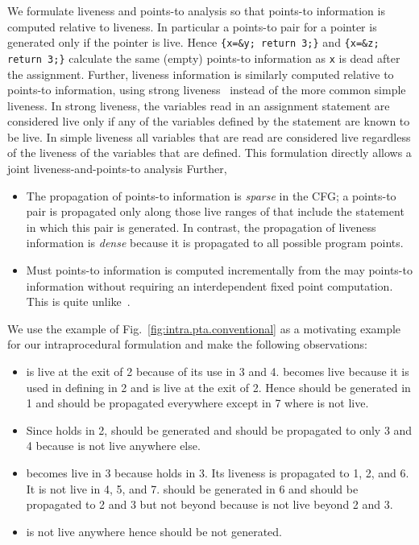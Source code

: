 \documentclass{llncs}
\newcommand{\pt}[2]{\text{}}
\begin{document}
We formulate liveness and points-to analysis so that points-to
information is computed relative to liveness. In particular a points-to
pair for a pointer is generated only if the pointer is live. Hence
{\tt \{x=\&y; return 3;\}} and {\tt \{x=\&z; return 3;\}} calculate
the same (empty) points-to information as {\tt x} is dead after the
assignment. Further, liveness information is similarly computed relative
to points-to information, using strong
liveness~\cite{Nielson.F.Nielson.HR.Hankin.C:1998:Principles-of-Program}
instead of the more common simple liveness. In strong liveness, the
variables read in an assignment statement are considered live only if
any of the variables defined by the statement are known to be live.
In simple liveness all variables that are read are considered live
regardless of the liveness of the variables that are defined. This
formulation directly allows a joint liveness-and-points-to analysis
Further,
\begin{itemize}
\item The propagation of points-to information is {\em sparse\/} in the
      CFG; a points-to pair \pt{x}{y} is propagated only along those live
      ranges of  that include the statement in which this pair is
      generated. In contrast, the propagation of liveness information
      is {\em dense\/} because it is propagated to all possible program
      points.

\item Must points-to information is computed incrementally from the may
      points-to information without requiring an interdependent fixed
      point computation. This is quite unlike~\cite{Emami.M.Ghiya.R.Hendren.LJ:1994:Context-sensitive-interprocedural-points-to,Kanade.A.Khedker.UP.Sanyal.A:2005:Heterogeneous-Fixed-Points}. 
\end{itemize}



We use the example of Fig.~\ref{fig:intra.pta.conventional} as a
motivating example for our intraprocedural formulation and make the
following observations:
\begin{itemize}
\item  is live at the exit of 2 because of its use in 3 and 4. 
      becomes live because it is used in defining  in 2 and  is
      live at the exit of 2. Hence \pt{q}{r} should be generated in 1
      and should be propagated everywhere except in 7 where  is not
      live.
\item Since \pt{q}{r} holds in 2, \pt{p}{r} should be generated and
      should be propagated to only 3 and 4 because  is not live
      anywhere else.
\item  becomes live in 3 because \pt{p}{r} holds in 3. Its liveness
      is propagated to 1, 2, and 6. It is not live in 4, 5, and 7.
      \pt{r}{s} should be generated in 6 and should be propagated to 2
      and 3 but not beyond because  is not live beyond 2 and 3.
\item  is not live anywhere hence \pt{s}{r} should be not generated.
\end{itemize}
\end{document}
